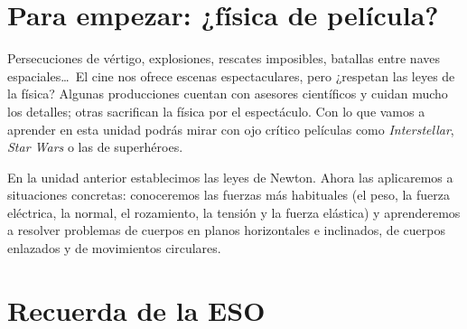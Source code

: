 
\section*{Para empezar: ¿física de película?}

Persecuciones de vértigo, explosiones, rescates imposibles, batallas entre naves espaciales\dots\ El cine nos ofrece escenas
espectaculares, pero ¿respetan las leyes de la física? Algunas producciones cuentan con asesores científicos y cuidan mucho los
detalles; otras sacrifican la física por el espectáculo. Con lo que vamos a aprender en esta unidad podrás mirar con ojo crítico
películas como \textit{Interstellar}, \textit{Star Wars} o las de superhéroes.

En la unidad anterior establecimos las leyes de Newton. Ahora las aplicaremos a situaciones concretas: conoceremos las fuerzas más
habituales (el peso, la fuerza eléctrica, la normal, el rozamiento, la tensión y la fuerza elástica) y aprenderemos a resolver
problemas de cuerpos en planos horizontales e inclinados, de cuerpos enlazados y de movimientos circulares.

\section{Recuerda de la ESO}\label{sec:ud11-eso}

